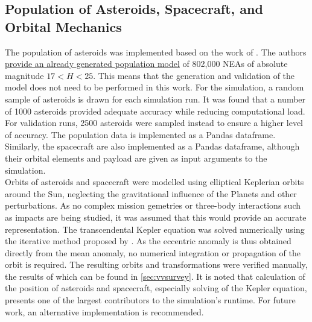 \subsection{Population of Asteroids, Spacecraft, and Orbital Mechanics}
The population of asteroids was implemented based on the work of \cite{GranvikPopulation}. The authors \href{http://www.iki.fi/mgranvik/data/Granvik+\_2018\_Icarus}{provide an already generated population model} of 802,000 NEAs of absolute magnitude $17 < H < 25$. This means that the generation and validation of the model does not need to be performed in this work. For the simulation, a random sample of asteroids is drawn for each simulation run. It was found that a number of 1000 asteroids provided adequate accuracy while reducing computational load. For validation runs, 2500 asteroids were sampled instead to ensure a higher level of accuracy.  The population data is implemented as a Pandas dataframe. Similarly, the spacecraft are also implemented as a Pandas dataframe, although their orbital elements and payload are given as input arguments to the simulation. \\

Orbits of asteroids and spacecraft were modelled using elliptical Keplerian orbits around the Sun, neglecting the gravitational influence of the Planets and other perturbations. As no complex mission gemetries or three-body interactions such as impacts are being studied, it was assumed that this would provide an accurate representation. The transcendental Kepler equation was solved numerically using the iterative method proposed by \cite{KeplerEquation}. As the eccentric anomaly is thus obtained directly from the mean anomaly, no numerical integration or propagation of the orbit is required. The resulting orbits and transformations were verified manually, the results of which can be found in \autoref{sec:vvsurvey}. It is noted that calculation of the position of asteroids and spacecraft, especially solving of the Kepler equation, presents one of the largest contributors to the simulation's runtime. For future work, an alternative implementation is recommended.

